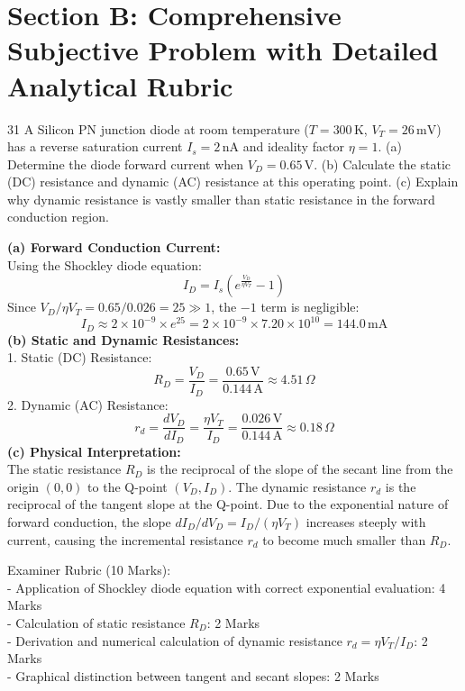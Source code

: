\newpage
\section{Section B: Comprehensive Subjective Problem with Detailed Analytical Rubric}

\begin{subjectiveq}{3}{1}
A Silicon PN junction diode at room temperature ($T = 300\,\mathrm{K}$, $V_T = 26\,\mathrm{mV}$) has a reverse saturation current $I_s = 2\,\mathrm{nA}$ and ideality factor $\eta = 1$. (a) Determine the diode forward current when $V_D = 0.65\,\mathrm{V}$. (b) Calculate the static (DC) resistance and dynamic (AC) resistance at this operating point. (c) Explain why dynamic resistance is vastly smaller than static resistance in the forward conduction region.
\end{subjectiveq}

\begin{solbox}
\textbf{(a) Forward Conduction Current:}\\
Using the Shockley diode equation:\\
\[ I_D = I_s \left( e^{\frac{V_D}{\eta V_T}} - 1 \right) \]
Since $V_D / \eta V_T = 0.65 / 0.026 = 25 \gg 1$, the $-1$ term is negligible:\\
\[ I_D \approx 2 \times 10^{-9} \times e^{25} = 2 \times 10^{-9} \times 7.20 \times 10^{10} = 144.0\,\mathrm{mA} \]
\textbf{(b) Static and Dynamic Resistances:}\\
1. Static (DC) Resistance:\\
\[ R_D = \frac{V_D}{I_D} = \frac{0.65\,\mathrm{V}}{0.144\,\mathrm{A}} \approx 4.51\,\Omega \]
2. Dynamic (AC) Resistance:\\
\[ r_d = \frac{d V_D}{d I_D} = \frac{\eta V_T}{I_D} = \frac{0.026\,\mathrm{V}}{0.144\,\mathrm{A}} \approx 0.18\,\Omega \]
\textbf{(c) Physical Interpretation:}\\
The static resistance $R_D$ is the reciprocal of the slope of the secant line from the origin $(0,0)$ to the Q-point $(V_D, I_D)$. The dynamic resistance $r_d$ is the reciprocal of the tangent slope at the Q-point. Due to the exponential nature of forward conduction, the slope $d I_D / d V_D = I_D / (\eta V_T)$ increases steeply with current, causing the incremental resistance $r_d$ to become much smaller than $R_D$.
\end{solbox}

\begin{examinertip}
Examiner Rubric (10 Marks):\\
- Application of Shockley diode equation with correct exponential evaluation: 4 Marks\\
- Calculation of static resistance $R_D$: 2 Marks\\
- Derivation and numerical calculation of dynamic resistance $r_d = \eta V_T / I_D$: 2 Marks\\
- Graphical distinction between tangent and secant slopes: 2 Marks
\end{examinertip}


